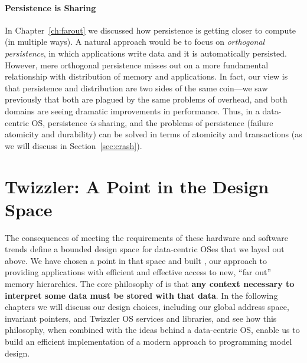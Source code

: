 \paragraph{Persistence is Sharing} In Chapter~\ref{ch:farout} we discussed how persistence is getting closer to compute
(in multiple ways). A natural approach would be to focus on \emph{orthogonal persistence}, in which applications write
data and it is automatically persisted. However, mere orthogonal persistence misses out on a more fundamental
relationship with distribution of memory and applications. In fact, our view is that persistence and distribution are
two sides of the same coin---we saw previously that both are plagued by the same problems of overhead, and both domains
are seeing dramatic improvements in performance. Thus, in a data-centric OS, persistence \emph{is} sharing, and the
problems of persistence (\eg failure atomicity and durability) can be solved in terms of atomicity and transactions (as
we will discuss in Section~\ref{sec:crash}).

\section{Twizzler: A Point in the Design Space}

The consequences of meeting the requirements of these hardware and software trends
define a bounded design space for data-centric OSes that we layed out above. We have
chosen a point in that space and built \Twizzler, our approach to providing
applications with efficient and effective access to new, ``far out'' memory hierarchies.
The core philosophy of \Twizzler is that \textbf{any context necessary to interpret some data must be stored with that
    data}.
In the
following chapters we will discuss our design choices, including our global address space, invariant pointers, and
Twizzler OS services and libraries, and see how this philosophy, when combined with the ideas behind a data-centric OS,
enable us to build an efficient implementation of a modern approach to programming model design.

